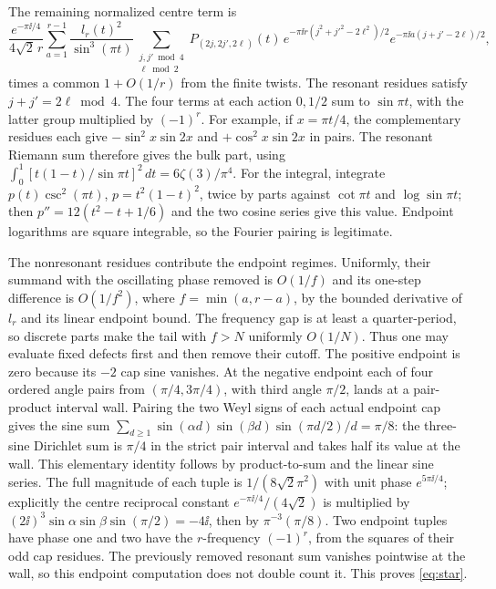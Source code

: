 The remaining normalized centre term is
\[
 \frac{e^{-\pi\ii/4}}{4\sqrt2\,r}
 \sum_{a=1}^{r-1}\frac{l_r(t)^2}{\sin^3(\pi t)}
 \sum_{\substack{j,j'\bmod4\\\ell\bmod2}}
  P_{(2j,2j',2\ell)}(t)\,
     e^{-\pi\ii r(j^2+j'^2-2\ell^2)/2}
     e^{-\pi\ii a(j+j'-2\ell)/2},
\]
times a common \(1+O(1/r)\) from the finite twists. The resonant residues satisfy \(j+j'=2\ell\bmod4\). The four terms at each action \(0,1/2\) sum to \(\sin\pi t\), with the latter group multiplied by \((-1)^r\). For example, if \(x=\pi t/4\), the complementary residues each give \(-\sin^2 x\sin2x\) and \(+\cos^2 x\sin2x\) in pairs. The resonant Riemann sum therefore gives the bulk part, using \(\int_0^1[t(1-t)/\sin\pi t]^2\,dt=6\zeta(3)/\pi^4\). For the integral, integrate \(p(t)\csc^2(\pi t)\), \(p=t^2(1-t)^2\), twice by parts against \(\cot\pi t\) and \(\log\sin\pi t\); then \(p''=12(t^2-t+1/6)\) and the two cosine series give this value. Endpoint logarithms are square integrable, so the Fourier pairing is legitimate.

The nonresonant residues contribute the endpoint regimes. Uniformly, their summand with the oscillating phase removed is \(O(1/f)\) and its one-step difference is \(O(1/f^2)\), where \(f=\min(a,r-a)\), by the bounded derivative of \(l_r\) and its linear endpoint bound. The frequency gap is at least a quarter-period, so discrete parts make the tail with \(f>N\) uniformly \(O(1/N)\). Thus one may evaluate fixed defects first and then remove their cutoff. The positive endpoint is zero because its \(-2\) cap sine vanishes. At the negative endpoint each of four ordered angle pairs from \((\pi/4,3\pi/4)\), with third angle \(\pi/2\), lands at a pair-product interval wall. Pairing the two Weyl signs of each actual endpoint cap gives the sine sum \(\sum_{d\ge1}\sin(\alpha d)\sin(\beta d)\sin(\pi d/2)/d=\pi/8\): the three-sine Dirichlet sum is \(\pi/4\) in the strict pair interval and takes half its value at the wall. This elementary identity follows by product-to-sum and the linear sine series. The full magnitude of each tuple is \(1/(8\sqrt2\pi^2)\) with unit phase \(e^{5\pi\ii/4}\); explicitly the centre reciprocal constant \(e^{-\pi\ii/4}/(4\sqrt2)\) is multiplied by \((2\ii)^3\sin\alpha\sin\beta\sin(\pi/2)=-4\ii\), then by \(\pi^{-3}(\pi/8)\). Two endpoint tuples have phase one and two have the \(r\)-frequency \((-1)^r\), from the squares of their odd cap residues. The previously removed resonant sum vanishes pointwise at the wall, so this endpoint computation does not double count it. This proves \eqref{eq:star}.

